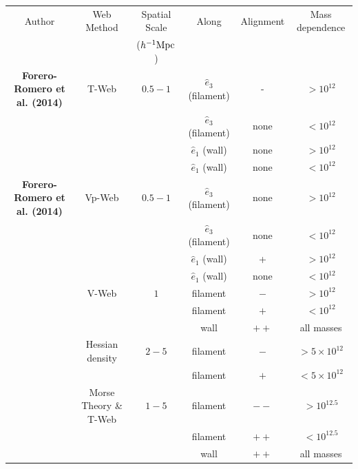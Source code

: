 \documentclass[useAMS,usenatbib]{mn2e}
\newcommand{\hMpc}{{\ifmmode{h^{-1}{\rm Mpc}}\else{$h^{-1}$Mpc }\fi}}
\newcommand{\hMsun}{{\ifmmode{h^{-1}{\rm
        {M_{\odot}}}}\else{$h^{-1}{\rm{M_{\odot}}}$~}\fi}}
\begin{document}
\begin{table}
\begin{tabular}{cccccc}\hline\hline
Author & Web Method & Spatial Scale& Along &
Alignment & Mass dependence\\
 & & ($\hMpc$)& & & \\\hline

{\bf Forero-Romero et al. (2014)} & T-Web & $0.5-1$ &
$\hat{e}_3$  (filament) & - & $>10^{12}$\hMsun\\

&   & &
$\hat{e}_3$  (filament) & none & $<10^{12}$\hMsun\\

&   & &
$\hat{e}_1$ (wall) & none & $>10^{12}$\hMsun\\

&   & &
$\hat{e}_1$ (wall) & none & $<10^{12}$\hMsun\\\hline

{\bf Forero-Romero et al. (2014)} & Vp-Web & $0.5-1$ &
$\hat{e}_3$  (filament) & none & $>10^{12}$\hMsun\\

&   & &
$\hat{e}_3$ (filament) & none & $<10^{12}$\hMsun\\

&   & &
$\hat{e}_1$ (wall) & + & $>10^{12}$\hMsun\\

&   & &
$\hat{e}_1$ (wall) & none & $<10^{12}$\hMsun\\\hline

\cite{Libeskind2013} & V-Web & $1$ &
filament &$-$ & $>10^{12}$\hMsun\\

&   & &
filament &$+$ & $<10^{12}$\hMsun\\

&   & &
wall & $++$ & all masses\\\hline

\cite{Trowland2013} & Hessian density & $2-5$ &
filament & $-$ & $> 5\times 10^{12}$\hMsun\\
&   & &
filament & $+$ & $< 5\times 10^{12}$\hMsun\\\hline

\cite{Codis2012} & Morse Theory \& T-Web & $1-5$ &
filament & $--$ & $>10^{12.5}$\hMsun \\

&   & &
filament & $++$ & $<10^{12.5}$\hMsun \\

& & &
wall & $++$ & all masses\\\hline


\end{tabular}
\end{table}
\end{document}
